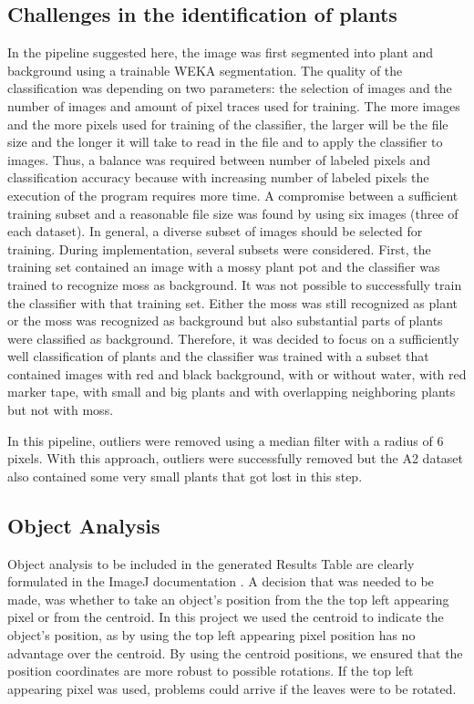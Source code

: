 \documentclass[paper=A4,bibliography=totocnumbered]{scrartcl}
\begin{document}
\subsection{Challenges in the identification of plants}
In the pipeline suggested here, the image was first segmented into plant and background using a trainable WEKA segmentation. The quality of the classification was depending on two parameters: the selection of images and the number of images and amount of pixel traces used for training. The more images and the more pixels used for training of the classifier, the larger will be the file size and the longer it will take to read in the file and to apply the classifier to images. Thus, a balance was required between number of labeled pixels and classification accuracy because with increasing number of labeled pixels the execution of the program requires more time. A compromise between a sufficient training subset and a reasonable file size was found by using six images (three of each dataset). In general, a diverse subset of images should be selected for training. During implementation, several subsets were considered. First, the training set contained an image with a mossy plant pot and the classifier was trained to recognize moss as background. It was not possible to successfully train the classifier with that training set. Either the moss was still recognized as plant or the moss was recognized as background but also substantial parts of plants were classified as background. Therefore, it was decided to focus on a sufficiently well classification of plants and the classifier was trained with a subset that contained images with red and black background, with or without water, with red marker tape, with small and big plants and with overlapping neighboring plants but not with moss.

In this pipeline, outliers were removed using a median filter with a radius of 6 pixels. With this approach, outliers were successfully removed but the A2 dataset also contained some very small plants that got lost in this step. 

\subsection{Object Analysis}
Object analysis to be included in the generated Results Table are clearly formulated in the ImageJ documentation \citep{Ferreira.2012}. A decision that was needed to be made, was whether to take an object's position from the the top left appearing pixel or from the centroid. In this project we used the centroid to indicate the object's position, as by using the top left appearing pixel position has no advantage over the centroid. By using the centroid positions, we ensured that the position coordinates are more robust to possible rotations. If the top left appearing pixel was used, problems could arrive if the leaves were to be rotated. 
\end{document}
